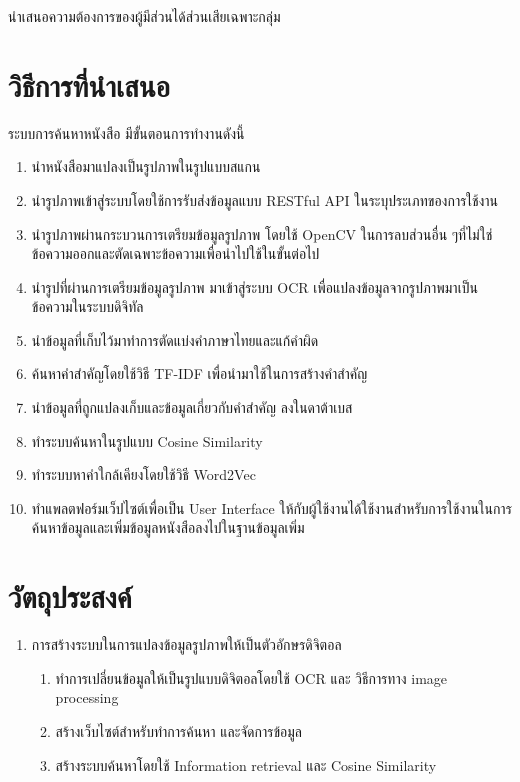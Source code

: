 นำเสนอความต้องการของผู้มีส่วนได้ส่วนเสียเฉพาะกลุ่ม 

\section{วิธีการที่นำเสนอ}

ระบบการค้นหาหนังสือ มีขั้นตอนการทำงานดังนี้

\begin{enumerate}
    \item นำหนังสือมาแปลงเป็นรูปภาพในรูปแบบสแกน
    \item นำรูปภาพเข้าสู่ระบบโดยใช้การรับส่งข้อมูลแบบ RESTful API ในระบุประเภทของการใช้งาน
    \item นำรูปภาพผ่านกระบวนการเตรียมข้อมูลรูปภาพ โดยใช้ OpenCV ในการลบส่วนอื่น ๆที่ไม่ใช่ข้อความออกและตัดเฉพาะข้อความเพื่อนำไปใช้ในขั้นต่อไป
    \item นำรูปที่ผ่านการเตรียมข้อมูลรูปภาพ มาเข้าสู่ระบบ OCR เพื่อแปลงข้อมูลจากรูปภาพมาเป็นข้อความในระบบดิจิทัล
    \item นำข้อมูลที่เก็บไว้มาทำการตัดแบ่งคำภาษาไทยและแก้คำผิด
    \item ค้นหาคำสำคัญโดยใช้วิธี TF-IDF เพื่อนำมาใช้ในการสร้างคำสำคัญ 
    \item นำข้อมูลที่ถูกแปลงเก็บและข้อมูลเกี่ยวกับคำสำคัญ ลงในดาต้าเบส 
    \item ทำระบบค้นหาในรูปแบบ Cosine Similarity
    \item ทำระบบหาคำใกล้เคียงโดยใช้วิธี Word2Vec
    \item ทำแพลตฟอร์มเว็ปไซต์เพื่อเป็น User Interface ให้กับผู้ใช้งานได้ใช้งานสำหรับการใช้งานในการค้นหาข้อมูลและเพิ่มข้อมูลหนังสือลงไปในฐานข้อมูลเพิ่ม
\end{enumerate}
\section{วัตถุประสงค์}

\begin{enumerate}
    \item การสร้างระบบในการแปลงข้อมูลรูปภาพให้เป็นตัวอักษรดิจิตอล
    \begin{enumerate}
        \item ทำการเปลี่ยนข้อมูลให้เป็นรูปแบบดิจิตอลโดยใช้ OCR และ วิธีการทาง image processing
        \item สร้างเว็บไซต์สำหรับทำการค้นหา และจัดการข้อมูล
        \item สร้างระบบค้นหาโดยใช้ Information retrieval และ Cosine Similarity
    \end{enumerate}
\end{enumerate}

